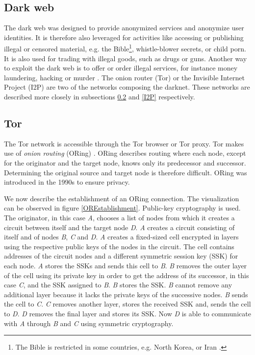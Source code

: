 \subsection{Dark web} \label{darkWeb}
The dark web was designed to provide anonymized services and anonymize user identities. It is therefore also leveraged for activities like accessing or publishing illegal or censored material, e.g. the Bible\footnote{The Bible is restricted in some countries, e.g. North Korea, or Iran \cite{illegalBible}.}, whistle-blower secrets, or child porn. It is also used for trading with illegal goods, such as drugs or guns. Another way to exploit the dark web is to offer or order illegal services, for instance money laundering, hacking or murder \cite{theDarkNet}. The onion router (Tor) or the Invisible Internet Project (I2P) are two of the networks composing the darknet. These networks are described more closely in subsections \ref{tor} and \ref{I2P} respectively.

\subsection{Tor} \label{tor}
The Tor network \cite{torIntro} is accessible through the Tor browser or Tor proxy. Tor makes use of \textit{onion routing} (ORing) \cite{onionRouting}. ORing describes routing where each node, except for the originator and the target node, knows only its predecessor and successor. Determining the original source and target node is therefore difficult. ORing was introduced in the 1990s to ensure privacy. 

We now describe the establishment of an ORing connection. The visualization can be observed in figure \ref{OREstablishment}. Public-key cryptography is used. The originator, in this case \textit{A}, chooses a list of nodes from which it creates a circuit between itself and the target node \textit{D}. \textit{A} creates a circuit consisting of itself and of nodes \textit{B}, \textit{C} and \textit{D}. \textit{A} creates a fixed-sized cell encrypted in layers using the respective public keys of the nodes in the circuit. The cell contains addresses of the circuit nodes and a different symmetric session key (SSK) for each node. \textit{A} stores the SSKs and sends this cell to \textit{B}. \textit{B} removes the outer layer of the cell using its private key in order to get the address of its successor, in this case \textit{C}, and the SSK assigned to \textit{B}. \textit{B} stores the SSK. \textit{B} cannot remove any additional layer because it lacks the private keys of the successive nodes. \textit{B} sends the cell to \textit{C}. \textit{C} removes another layer, stores the received SSK and, sends the cell to \textit{D}. \textit{D} removes the final layer and stores its SSK. Now \textit{D} is able to communicate with \textit{A} through \textit{B} and \textit{C} using symmetric cryptography. 

